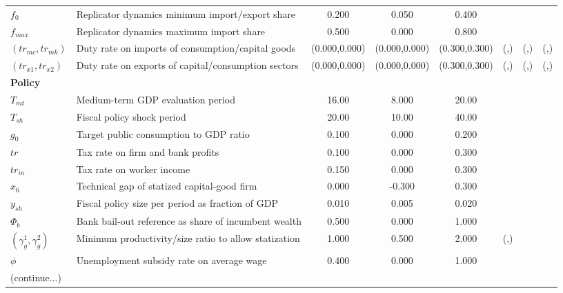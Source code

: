 \documentclass[a4paper,11pt]{article}
\begin{document}
\begin{appendices}
\begin{landscape}
\begin{table}[h]
\begin{tabular}{llcccccc}
$f_0$							& Replicator dynamics minimum import/export share 		& 0.200				& 0.050			& 0.400			& 					& 					& 	 \\
$f_{max}$						& Replicator dynamics maximum import share				& 0.500				& 0.000			& 0.800			& 					& 					& 	 \\
$({tr}_{mc},{tr}_{mk})$			& Duty rate on imports of consumption/capital goods		& (0.000,0.000)		& (0.000,0.000)	& (0.300,0.300)	& (,)				& (,)				& (,) \\
$({tr}_{x1},{tr}_{x2})$			& Duty rate on exports of capital/consumption sectors	& (0.000,0.000)		& (0.000,0.000)	& (0.300,0.300)	& (,)				& (,)				& (,) \\
\midrule
\multicolumn{2}{l}{\textbf{Policy}} \\
$T_{mt}$ 						& Medium-term GDP evaluation period						& 16.00				& 8.000			& 20.00			& 					& 					& 	 \\
$T_{sh}$ 						& Fiscal policy shock period							& 20.00				& 10.00			& 40.00			& 					& 					& 	 \\
$g_0$ 							& Target public consumption to GDP ratio				& 0.100				& 0.000			& 0.200			& 					& 					& 	 \\
$tr$ 							& Tax rate on firm and bank profits						& 0.100				& 0.000			& 0.300			& 					& 					& 	 \\
${tr}_{in}$						& Tax rate on worker income								& 0.150				& 0.000			& 0.300			& 					& 					& 	 \\
$x_6$ 							& Technical gap of statized capital-good firm			& 0.000				& -0.300		& 0.300			& 					& 					& 	 \\
$y_{sh}$ 						& Fiscal policy size per period as fraction of GDP		& 0.010				& 0.005			& 0.020			& 					& 					& 	 \\
$\Phi_b$ 						& Bank bail-out reference as share of incumbent	wealth	& 0.500				& 0.000			& 1.000			& 					& 					& 	 \\
$(\gamma^1_g,\gamma^2_g)$ 		& Minimum productivity/size ratio to allow statization	& 1.000				& 0.500			& 2.000			& (,)				& 					& 	 \\
$\phi$ 							& Unemployment subsidy rate on average wage				& 0.400				& 0.000			& 1.000			& 					& 					& 	 \\
\bottomrule
(continue...)
\end{tabular}
\end{table}


\end{landscape}
\end{appendices}
\end{document}
